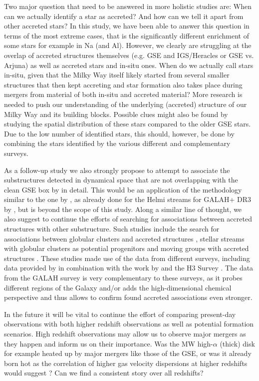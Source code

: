 \documentclass[fleqn,usenatbib]{mnras}
\begin{document}
Two major question that need to be answered in more holistic studies are: When can we actually identify a star as accreted? And how can we tell it apart from other accreted stars? In this study, we have been able to answer this question in terms of the most extreme cases, that is the significantly different enrichment of some stars for example in Na (and Al). However, we clearly are struggling at the overlap of accreted structures themselves (e.g. GSE and IGS/Heracles or GSE vs. Arjuna) as well as accreted stars and in-situ ones. When do we actually call stars in-situ, given that the Milky Way itself likely started from several smaller structures that then kept accreting and star formation also takes place during mergers from material of both in-situ and accreted material? More research is needed to push our understanding of the underlying (accreted) structure of our Milky Way and its building blocks. Possible clues might also be found by studying the spatial distribution of these stars compared to the older GSE stars. Due to the low number of identified stars, this should, however, be done by combining the stars identified by the various different and complementary surveys.

As a follow-up study we also strongly propose to attempt to associate the substructures detected in dynamical space that are not overlapping with the clean GSE box by \citet{Feuillet2021} in detail. This would be an application of the methodology similar to the one by \citet{Naidu2020}, as already done for the Helmi streams for GALAH+ DR3 by \citet{Limberg2021}, but is beyond the scope of this study. Along a similar line of thought, we also suggest to continue the efforts of searching for associations between accreted structures with other substructure. Such studies include the search for associations between globular clusters and accreted structures \citep{Massari2019}, stellar streams with globular clusters as potential progenitors \citep{Bonaca2021} and moving groups with accreted structures \citep{Schuler2021}. These studies made use of the data from different surveys, including data provided by \cite{Helmi2018b} in combination with the work by \citet{Vasiliev2019} and the H3 Survey \citep{Conroy2019}. The data from the GALAH survey is very complementary to these surveys, as it probes different regions of the Galaxy and/or adds the high-dimensional chemical perspective and thus allows to confirm found accreted associations even stronger.


In the future it will be vital to continue the effort of comparing present-day observations with both higher redshift observations as well as potential formation scenarios. High redshift observations may allow us to observe major mergers as they happen and inform us on their importance. Was the MW high-$\alpha$ (thick) disk for example heated up by major mergers like those of the GSE, or was it already born hot as the correlation of higher gas velocity dispersions at higher redshifts would suggest \citep{Wisnioski2015, Leaman2017}? Can we find a consistent story over all redshifts?
\end{document}

